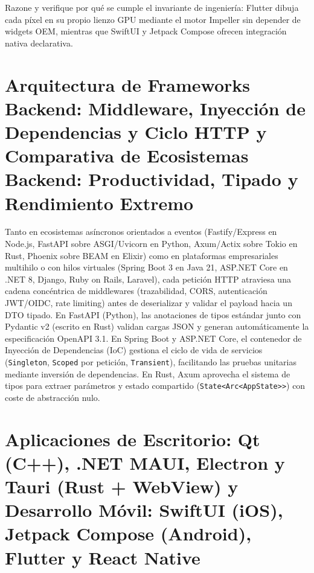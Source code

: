 \documentclass{book}
\begin{document}
\begin{tcolorbox}[title={Autoficha}, studiumcheck, breakable]

Razone y verifique por qué se cumple el invariante de ingeniería: Flutter dibuja cada píxel en su propio lienzo GPU mediante el motor Impeller sin depender de widgets OEM, mientras que SwiftUI y Jetpack Compose ofrecen integración nativa declarativa.
\end{tcolorbox}

\section{Arquitectura de Frameworks Backend: Middleware, Inyección de Dependencias y Ciclo HTTP y Comparativa de Ecosistemas Backend: Productividad, Tipado y Rendimiento Extremo}

Tanto en ecosistemas asíncronos orientados a eventos (Fastify/Express en Node.js, FastAPI sobre ASGI/Uvicorn en Python, Axum/Actix sobre Tokio en Rust, Phoenix sobre BEAM en Elixir) como en plataformas empresariales multihilo o con hilos virtuales (Spring Boot 3 en Java 21, ASP.NET Core en .NET 8, Django, Ruby on Rails, Laravel), cada petición HTTP atraviesa una cadena concéntrica de middlewares (trazabilidad, CORS, autenticación JWT/OIDC, rate limiting) antes de deserializar y validar el payload hacia un DTO tipado.
En FastAPI (Python), las anotaciones de tipos estándar junto con Pydantic v2 (escrito en Rust) validan cargas JSON y generan automáticamente la especificación OpenAPI 3.1. En Spring Boot y ASP.NET Core, el contenedor de Inyección de Dependencias (IoC) gestiona el ciclo de vida de servicios (\texttt{Singleton}, \texttt{Scoped} por petición, \texttt{Transient}), facilitando las pruebas unitarias mediante inversión de dependencias. En Rust, Axum aprovecha el sistema de tipos para extraer parámetros y estado compartido (\texttt{State<Arc<AppState>>}) con coste de abstracción nulo.

\section{Aplicaciones de Escritorio: Qt (C++), .NET MAUI, Electron y Tauri (Rust + WebView) y Desarrollo Móvil: SwiftUI (iOS), Jetpack Compose (Android), Flutter y React Native}
\end{document}
